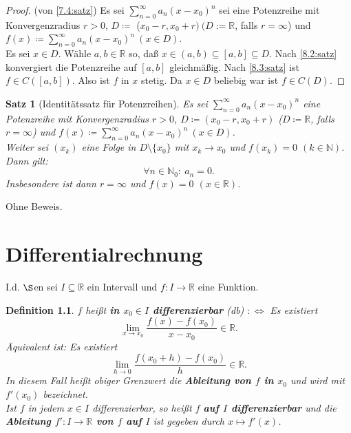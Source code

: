 \documentclass[12pt]{extreport} %
\newcommand{\N}{\mathbb{N}}
\newcommand{\R}{\mathbb{R}}
\theoremstyle{named}
\theoremstyle{itshape}
\newtheorem{satz}[unnamedtheorem]{Satz}
\newtheorem*{definition}{Definition}
\theoremstyle{normal}
\begin{document}
{\begin{proof}(von \ref{7.4:satz}) Es sei $\sum_{n=0}^{\infty}a_{n}(x - x_{0})^{n}$ sei eine Potenzreihe mit Konvergenzradius $r > 0$, $D \coloneqq$ 
($x_{0} - r, x_{0} + r) ~(D := \R$, falls $r = \infty$) und $f(x) \coloneqq \sum_{n=0}^{\infty} a_{n}(x-x_{0})^{n} ~(x \in D)$. \\ 
Es sei $x \in D$. Wähle $a, b \in \R$ so, da{\ss} $x \in (a, b) \subseteq [a, b] \subseteq D$. Nach \ref{8.2:satz} konvergiert die Potenzreihe auf 
$[a, b]$ gleichmä{\ss}ig. Nach \ref{8.3:satz} ist $f \in C([a, b])$. Also ist $f$ in $x$ stetig. Da $x \in D$ beliebig war ist $f \in C(D)$.
\end{proof}

\begin{satz}[Identitätssatz für Potenzreihen] \label{8.4:prop-IdentitätssatzFürPotenzreihe}
	Es sei $\sum_{n=0}^{\infty} a_{n} (x - x_{0})^{n}$ eine Potenzreihe mit Konvergenzradius $r > 0$, $D \coloneqq (x_{0} - r, x_{0} + r)$ ($D \coloneqq \R$, falls $r = \infty$) 
	und $f(x) \coloneqq \sum_{n=0}^{\infty} a_{n} (x - x_{0})^{n} ~(x \in D)$. \\
	Weiter sei $(x_{k})$ eine Folge in $D \setminus \{ x_{0} \}$ mit $x_{k} \rightarrow x_{0}$ und $f(x_{k}) = 0$ $(k \in \N)$. Dann gilt:
	$$\forall n \in \N_{0}: ~  a_{n} = 0.$$ 
	Insbesondere ist dann $r= \infty$ und $f(x)=0$ $(x \in \R)$.
\end{satz}

Ohne Beweis.

\newpage


\chapter{Differentialrechnung}

I.d. $\S$en sei $I \subseteq \R$ ein Intervall und $f \colon I \rightarrow \R$ eine Funktion. 


 
\begin{definition}
	$f$ hei{\ss}t \textbf{in $x_{0} \in I$ differenzierbar} (db) $:\iff$ Es existiert
		$$\lim_{x \rightarrow x_{0}} \frac{f(x) - f(x_{0})}{x - x_{0}} \in \R. $$
	Äquivalent ist: Es existiert 
	$$
	\lim_{h \rightarrow 0} \frac{f(x_{0} + h) - f(x_{0})}{h}\in \R.
	$$
	In diesem Fall hei{\ss}t obiger Grenzwert die \textbf{Ableitung von $f$ in $x_{0}$} und wird mit $f'(x_{0})$ bezeichnet. \\
	Ist $f$ in jedem $x \in I$ differenzierbar, so hei{\ss}t $f$ \textbf{auf $I$ differenzierbar} und die \textbf{Ableitung $f':I \to \R$ von $f$ auf $I$} ist gegeben durch 
	$x \mapsto f'(x)$.
\end{definition}


}
\end{document}
